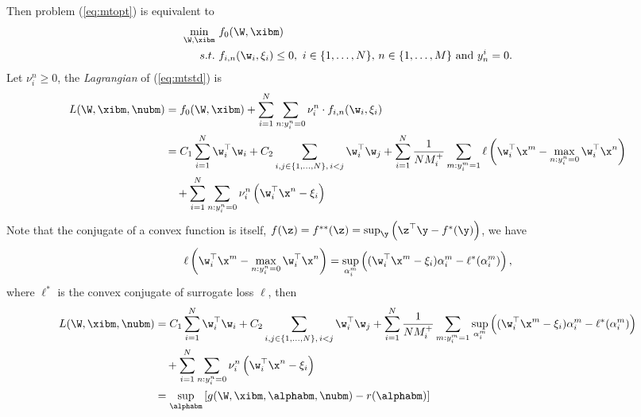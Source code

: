 Then problem (\ref{eq:mtopt}) is equivalent to 
\begin{equation}
\label{eq:mtstd}
\begin{aligned}
\min_{\W, \xibm} \ & f_0(\W, \xibm) \\
s.t. \ & f_{i,n}(\w_i, \xi_i) \le 0, \ i \in \{1,\dots,N\}, \, n \in \{1,\dots,M\} \ \mathrm{and} \ y_n^i = 0.
\end{aligned}
\end{equation}
Let $\nu_i^n \ge 0$, the \emph{Lagrangian} of (\ref{eq:mtstd}) is
\begin{equation*}
\begin{aligned}
L(\W, \xibm, \nubm) 
&= f_0(\W, \xibm) + \sum_{i=1}^{N} \sum_{n: y_i^n = 0} \nu_i^n \cdot f_{i,n}(\w_i, \xi_i) \\
&= C_1 \sum_{i=1}^{N} \w_i^\top \w_i + C_2 \sum_{i, j \in \{1,\dots,N\}, \, i < j} \w_i^\top \w_j
   + \sum_{i = 1}^{N} \frac{1}{N M_i^+} \sum_{m: y_i^m = 1} \ell \left( \w_i^\top \x^m - \max_{n: y_i^n = 0} \w_i^\top \x^n \right) \\
& \quad  + \sum_{i=1}^{N} \sum_{n: y_i^n = 0} \nu_i^n \left( \w_i^\top \x^n - \xi_i \right) \\
\end{aligned}
\end{equation*}
Note that the conjugate of a convex function is itself, \ie $f(\z) = f^{**}(\z) = \sup_\y \left( \z^\top \y - f^*(\y) \right)$, we have
\begin{equation*}
\begin{aligned}
\ell \left( \w_i^\top \x^m - \max_{n: y_i^n = 0} \w_i^\top \x^n \right) 
= \sup_{\alpha_i^m} \left( (\w_i^\top \x^m - \xi_i) \alpha_i^m - \ell^*(\alpha_i^m) \right),
\end{aligned}
\end{equation*}
where $\ell^*$ is the convex conjugate of surrogate loss $\ell$, then
\begin{equation*}
\begin{aligned}
L(\W, \xibm, \nubm) 
&= C_1 \sum_{i=1}^{N} \w_i^\top \w_i + C_2 \sum_{i, j \in \{1,\dots,N\}, \, i < j} \w_i^\top \w_j
   + \sum_{i = 1}^{N} \frac{1}{N M_i^+} \sum_{m: y_i^m = 1} 
     \sup_{\alpha_i^m} \left( (\w_i^\top \x^m - \xi_i) \alpha_i^m - \ell^*(\alpha_i^m) \right) \\
& \quad  + \sum_{i=1}^{N} \sum_{n: y_i^n = 0} \nu_i^n \left( \w_i^\top \x^n - \xi_i \right) \\
&= \sup_\alphabm \left[ g(\W, \xibm, \alphabm, \nubm) - r(\alphabm) \right]
\end{aligned}
\end{equation*}
